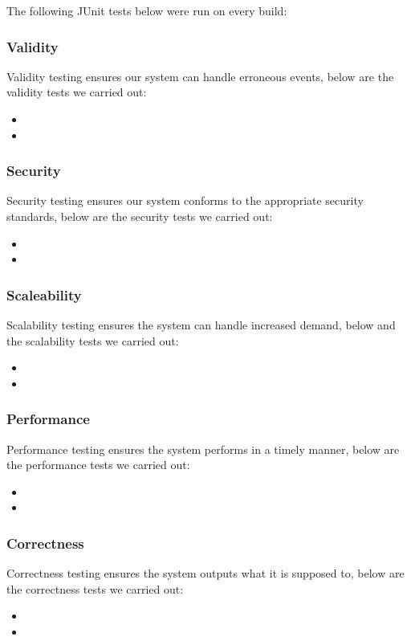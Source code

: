 \documentclass[11pt]{article}
\begin{document}
The following JUnit tests below were run on every build:

\subsubsection{Validity}
Validity testing ensures our system can handle erroneous events, below are the validity tests we carried out:
\begin{itemize}
\item
\item
\end{itemize}
\subsubsection{Security}
Security testing ensures our system conforms to the appropriate security standards, below are the security tests we carried out:
\begin{itemize}
\item
\item
\end{itemize}
\subsubsection{Scaleability}
Scalability testing ensures the system can handle increased demand, below and the scalability tests we carried out:
\begin{itemize}
\item
\item
\end{itemize}
\subsubsection{Performance}
Performance testing ensures the system performs in a timely manner, below are the performance tests we carried out: 
\begin{itemize}
\item
\item
\end{itemize}
\subsubsection{Correctness}
Correctness testing ensures the system outputs what it is supposed to, below are the correctness tests we carried out:
\begin{itemize}
\item
\item
\end{itemize}
\end{document}
